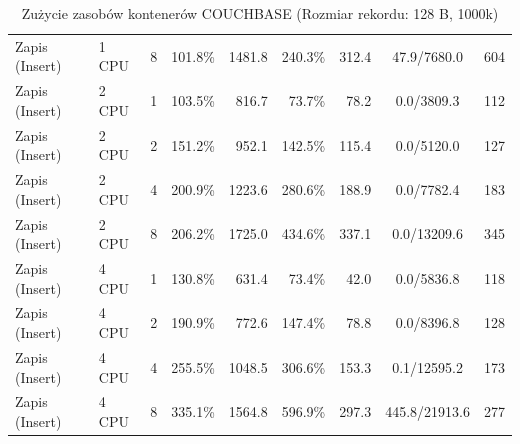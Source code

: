 \begin{table}[ht]
{\begin{tabular}{llcrrrrcc}
Zapis (Insert) & 1 CPU & 8 & 101.8\% & 1481.8 & 240.3\% & 312.4 & 47.9/7680.0 & 604 \\
Zapis (Insert) & 2 CPU & 1 & 103.5\% & 816.7 & 73.7\% & 78.2 & 0.0/3809.3 & 112 \\
Zapis (Insert) & 2 CPU & 2 & 151.2\% & 952.1 & 142.5\% & 115.4 & 0.0/5120.0 & 127 \\
Zapis (Insert) & 2 CPU & 4 & 200.9\% & 1223.6 & 280.6\% & 188.9 & 0.0/7782.4 & 183 \\
Zapis (Insert) & 2 CPU & 8 & 206.2\% & 1725.0 & 434.6\% & 337.1 & 0.0/13209.6 & 345 \\
Zapis (Insert) & 4 CPU & 1 & 130.8\% & 631.4 & 73.4\% & 42.0 & 0.0/5836.8 & 118 \\
Zapis (Insert) & 4 CPU & 2 & 190.9\% & 772.6 & 147.4\% & 78.8 & 0.0/8396.8 & 128 \\
Zapis (Insert) & 4 CPU & 4 & 255.5\% & 1048.5 & 306.6\% & 153.3 & 0.1/12595.2 & 173 \\
Zapis (Insert) & 4 CPU & 8 & 335.1\% & 1564.8 & 596.9\% & 297.3 & 445.8/21913.6 & 277 \\
\bottomrule
\end{tabular}%
}
\caption{Zużycie zasobów kontenerów COUCHBASE (Rozmiar rekordu: 128 B, 1000k)}
\label{tab:resources_couchbase_small_1000000}
\end{table}
